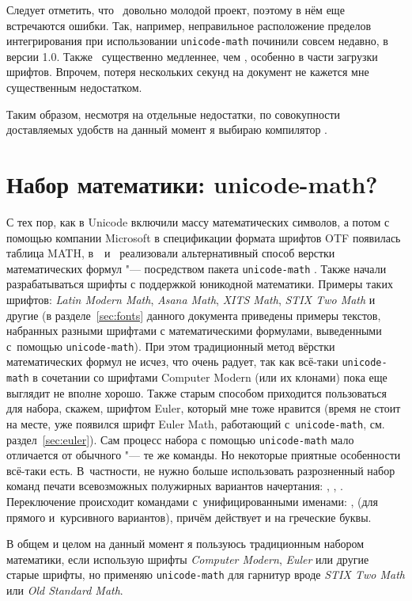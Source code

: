 \documentclass[a4paper,12pt,hyphens]{article}
\newcommand\package[1]{\texttt{#1}}
\newcommand\lcmd[1]{\texttt{#1}}
\begin{document}
Следует отметить, что \LuaTeX\ довольно молодой проект, поэтому в нём еще
встречаются ошибки. Так, например, неправильное расположение пределов
интегрирования при использовании \package{unicode-math} починили совсем недавно,
в версии 1.0. Также \LuaTeX\ существенно медленнее, чем \pdfTeX, особенно в части
загрузки шрифтов. Впрочем, потеря нескольких секунд на документ не кажется мне
существенным недостатком.

Таким образом, несмотря на отдельные недостатки, по совокупности доставляемых
удобств на данный момент я выбираю компилятор \LuaTeX.

\section{Набор математики: unicode-math?}
С тех пор, как в Unicode включили массу математических символов, а потом с
помощью компании Microsoft в спецификации формата шрифтов OTF
появилась таблица MATH, в~\LuaLaTeX\ и \XeTeX\ реализовали альтернативный
способ верстки математических формул "--- посредством пакета
\package{unicode-math} \parencite{ctan-unicode-math}.
Также начали разрабатываться шрифты с поддержкой юникодной математики. Примеры таких
шрифтов: \emph{Latin Modern Math}, \emph{Asana Math}, \emph{XITS Math},
\emph{STIX Two Math} и другие (в разделе~\ref{sec:fonts} данного документа приведены
примеры текстов, набранных разными шрифтами с математическими формулами, выведенными
с~помощью \package{unicode-math}).
При этом традиционный метод вёрстки математических формул не исчез, что
очень радует, так как всё-таки \package{unicode-math} в сочетании со шрифтами
Computer Modern (или их клонами) пока еще выглядит не вполне хорошо.
Также старым способом приходится пользоваться для набора, скажем, шрифтом
Euler, который мне тоже нравится (время не стоит на месте, уже появился шрифт Euler Math,
работающий с~\package{unicode-math}, см. раздел~\ref{sec:euler}). Сам процесс набора с помощью \package{unicode-math}
мало отличается от обычного "--- те же команды. Но некоторые приятные особенности всё-таки
есть. В~частности, не нужно больше использовать разрозненный набор команд
печати всевозможных полужирных вариантов начертания: \lcmd{\mathbf}, \lcmd{\boldkey},
\lcmd{\boldsymbol}. Переключение происходит командами с~унифицированными именами:
\lcmd{\symbfup}, \lcmd{\symbfit} (для прямого и~курсивного вариантов), причём
действует и на греческие буквы.

В общем и целом на данный момент я пользуюсь традиционным набором математики,
если использую шрифты \emph{Computer Modern}, \emph{Euler} или другие старые шрифты, но
применяю \package{unicode-math} для гарнитур вроде \emph{STIX Two Math} или
\emph{Old Standard Math}.
\end{document}
